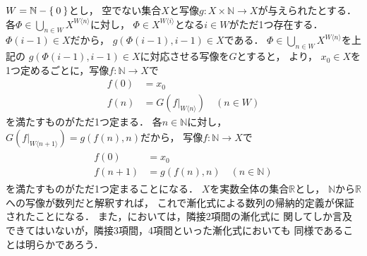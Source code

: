 \documentclass[11pt,a4paper]{ltjsarticle} %
\theoremstyle{mystyle} %
\begin{document}
$W = \mathbb{N} - \Set{0}$とし，
空でない集合$X$と写像$g \colon X \times \mathbb{N} \longrightarrow X$が与えられたとする．
各$\varPhi \in \bigcup _{n \in W} X^{W \langle n \rangle}$に対し，
$\varPhi \in X^{W \langle i \rangle}$となる$i \in W$がただ1つ存在する．
$\varPhi (i-1) \in X $だから，
$g( \varPhi (i-1) , i-1) \in X$である．
$\varPhi \in \bigcup_{n \in W} X^{W \langle n \rangle }$を上記の
$g (\varPhi (i-1) , i-1) \in X$に対応させる写像を$G$とすると，
より，
$x_0 \in X$を1つ定めるごとに，写像$f \colon \mathbb{N} \longrightarrow X$で
\begin{align*}
	f(0) & = x_0                                                       \\
	f(n) & = G \left( f|_{W \langle n \rangle} \right) \quad (n \in W)
\end{align*}
を満たすものがただ1つ定まる．
各$n \in \mathbb{N}$に対し，$G \left( f|_{W \langle n+1 \rangle} \right)
	= g (f(n), n)$だから，
写像$f \colon \mathbb{N} \longrightarrow X$で
\begin{align}
	\begin{aligned}
		f(0)   & = x_0                                \\
		f(n+1) & = g(f(n),n) \quad (n \in \mathbb{N})
	\end{aligned}
	\label{eq:zenkasikimap}
\end{align}
を満たすものがただ1つ定まることになる．
$X$を実数全体の集合$\mathbb{R}$とし，
$\mathbb{N}$から$\mathbb{R}$への写像が数列だと解釈すれば，
これで漸化式による数列の帰納的定義が保証されたことになる．
また，においては，隣接2項間の漸化式に
関してしか言及できてはいないが，隣接3項間，4項間といった漸化式においても
同様であることは明らかであろう．

%
\printbibliography[title=参考文献]
\end{document}
